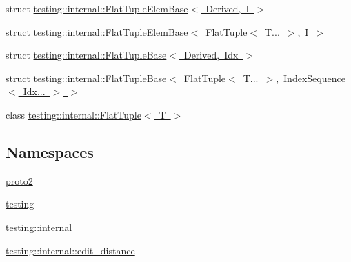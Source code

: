\begin{DoxyCompactItemize}
\item 
struct \mbox{\hyperlink{structtesting_1_1internal_1_1_flat_tuple_elem_base}{testing\+::internal\+::\+Flat\+Tuple\+Elem\+Base$<$ Derived, I $>$}}
\item 
struct \mbox{\hyperlink{structtesting_1_1internal_1_1_flat_tuple_elem_base_3_01_flat_tuple_3_01_t_8_8_8_01_4_00_01_i_01_4}{testing\+::internal\+::\+Flat\+Tuple\+Elem\+Base$<$ Flat\+Tuple$<$ T... $>$, I $>$}}
\item 
struct \mbox{\hyperlink{structtesting_1_1internal_1_1_flat_tuple_base}{testing\+::internal\+::\+Flat\+Tuple\+Base$<$ Derived, Idx $>$}}
\item 
struct \mbox{\hyperlink{structtesting_1_1internal_1_1_flat_tuple_base_3_01_flat_tuple_3_01_t_8_8_8_01_4_00_01_index_sequence_3_01_idx_8_8_8_01_4_01_4}{testing\+::internal\+::\+Flat\+Tuple\+Base$<$ Flat\+Tuple$<$ T... $>$, Index\+Sequence$<$ Idx... $>$ $>$}}
\item 
class \mbox{\hyperlink{classtesting_1_1internal_1_1_flat_tuple}{testing\+::internal\+::\+Flat\+Tuple$<$ T $>$}}
\end{DoxyCompactItemize}
\subsection*{Namespaces}
\begin{DoxyCompactItemize}
\item 
 \mbox{\hyperlink{namespaceproto2}{proto2}}
\item 
 \mbox{\hyperlink{namespacetesting}{testing}}
\item 
 \mbox{\hyperlink{namespacetesting_1_1internal}{testing\+::internal}}
\item 
 \mbox{\hyperlink{namespacetesting_1_1internal_1_1edit__distance}{testing\+::internal\+::edit\+\_\+distance}}
\end{DoxyCompactItemize}
